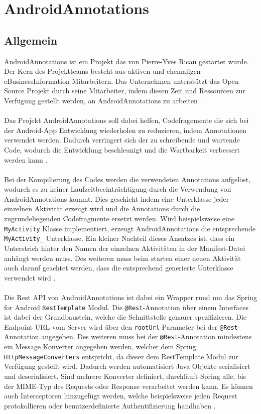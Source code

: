 \newpage
\section{AndroidAnnotations}
\label{androidannoations}
\subsection{Allgemein}
AndroidAnnotations ist ein Projekt das von Pierre-Yves Ricau gestartet wurde. Der Kern des Projektteams besteht aus aktiven und ehemaligen eBusinessInformation Mitarbeitern. Das Unternehmen unterstützt das Open Source Projekt durch seine Mitarbeiter, indem diesen Zeit und Ressourcen zur Verfügung gestellt werden, an AndroidAnnotations zu arbeiten \cite{annotation:sponsors}.
\\\\
Das Projekt AndroidAnnotations soll dabei helfen, Codefragemente die sich bei der Android-App Entwicklung wiederholen zu reduzieren, indem Annotationen verwendet werden. Dadurch verringert sich der zu schreibende und wartende Code, wodurch die Entwicklung beschleunigt und die Wartbarkeit verbessert werden kann \cite{annotation:introduction}. 
\\\\
Bei der Kompilierung des Codes werden die verwendeten Annotations aufgelöst, wodurch es zu keiner Laufzeitbeeinträchtigung durch die Verwendung von AndroidAnnotations kommt. Dies geschieht indem eine Unterklasse jeder einzelnen Aktivität erzeugt wird und die Annotations durch die zugrundeliegenden Codefragmente ersetzt werden. Wird beispielsweise eine \texttt{MyActivity} Klasse implementiert, erzeugt AndroidAnnotations die entsprechende \texttt{MyActivity\_} Unterklasse. Ein kleiner Nachteil dieses Ansatzes ist, dass ein Unterstrich hinter den Namen der einzelnen Aktivitäten in der Manifest-Datei anhängt werden muss. Des weiteren muss beim starten einer neuen Aktivität auch darauf geachtet werden, dass die entsprechend generierte Unterklasse verwendet wird \cite{annotation:spring}. 
\\\\
Die Rest API von AndroidAnnotations ist dabei ein Wrapper rund um das Spring for Android \texttt{RestTemplate} Modul. Die \texttt{@Rest}-Annotation über einem Interfaces ist dabei der Grundbaustein, welche die Schnittstelle genauer spezifizieren. Die Endpoint URL vom Server wird über den \texttt{rootUrl} Parameter bei der \texttt{@Rest}-Annotation angegeben. Des weiteren muss bei der \texttt{@Rest}-Annotation mindestens ein Message Konverter angegeben werden, welcher dem Spring \texttt{HttpMessageConverters} entspricht, da dieser dem RestTemplate Modul zur Verfügung gestellt wird. Dadurch werden automatisiert Java Objekte serialisiert und deserialisiert. Sind mehrere Konverter definiert, durchläuft Spring alle, bis der MIME-Typ des Requests oder Response verarbeitet werden kann. Es können auch Interceptoren hinzugefügt werden, welche beispielsweise jeden Request protokollieren oder benutzerdefinierte Authentifizierung handhaben \cite{annotation:rest}.
